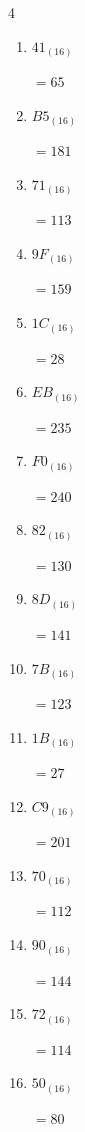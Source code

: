 \begin{multicols}{4}
\begin{enumerate}
        $=110$

  \item $41_{(16)}$

        $=65$

  \item $B5_{(16)}$

        $=181$

  \item $71_{(16)}$

        $=113$

  \item $9F_{(16)}$

        $=159$

\columnbreak %

  \item $1C_{(16)}$

        $=28$

  \item $EB_{(16)}$

        $=235$

  \item $F0_{(16)}$

        $=240$

  \item $82_{(16)}$

        $=130$

  \item $8D_{(16)}$

        $=141$

  \item $7B_{(16)}$

        $=123$

  \item $1B_{(16)}$

        $=27$

  \item $C9_{(16)}$

        $=201$

  \item $70_{(16)}$

        $=112$

  \item $90_{(16)}$

        $=144$

  \item $72_{(16)}$

        $=114$

  \item $50_{(16)}$

        $=80$


\end{enumerate}
\end{multicols}
